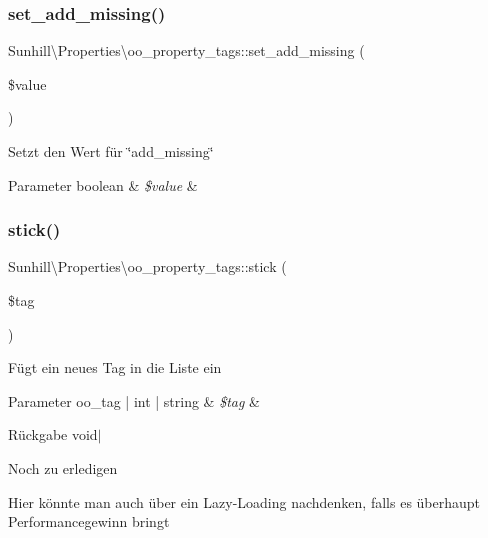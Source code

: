 \subsubsection{\texorpdfstring{set\+\_\+add\+\_\+missing()}{set\_add\_missing()}}
{\footnotesize\ttfamily Sunhill\textbackslash{}\+Properties\textbackslash{}oo\+\_\+property\+\_\+tags\+::set\+\_\+add\+\_\+missing (\begin{DoxyParamCaption}\item[{bool}]{\$value }\end{DoxyParamCaption})}

Setzt den Wert für \char`\"{}add\+\_\+missing\char`\"{} 
\begin{DoxyParams}[1]{Parameter}
boolean & {\em \$value} & \\
\hline
\end{DoxyParams}
\mbox{\label{classSunhill_1_1Properties_1_1oo__property__tags_aee694204c0b94ca849b36aeb2eb5cceb}} 
\subsubsection{\texorpdfstring{stick()}{stick()}}
{\footnotesize\ttfamily Sunhill\textbackslash{}\+Properties\textbackslash{}oo\+\_\+property\+\_\+tags\+::stick (\begin{DoxyParamCaption}\item[{}]{\$tag }\end{DoxyParamCaption})}

Fügt ein neues Tag in die Liste ein 
\begin{DoxyParams}[1]{Parameter}
oo\+\_\+tag | int | string & {\em \$tag} & \\
\hline
\end{DoxyParams}
\begin{DoxyReturn}{Rückgabe}
void$\vert$ 
\end{DoxyReturn}
\begin{DoxyRefDesc}{Noch zu erledigen}
\item[\hyperlink{todo__todo000002}{Noch zu erledigen}]Hier könnte man auch über ein Lazy-\/\+Loading nachdenken, falls es überhaupt Performancegewinn bringt \end{DoxyRefDesc}


